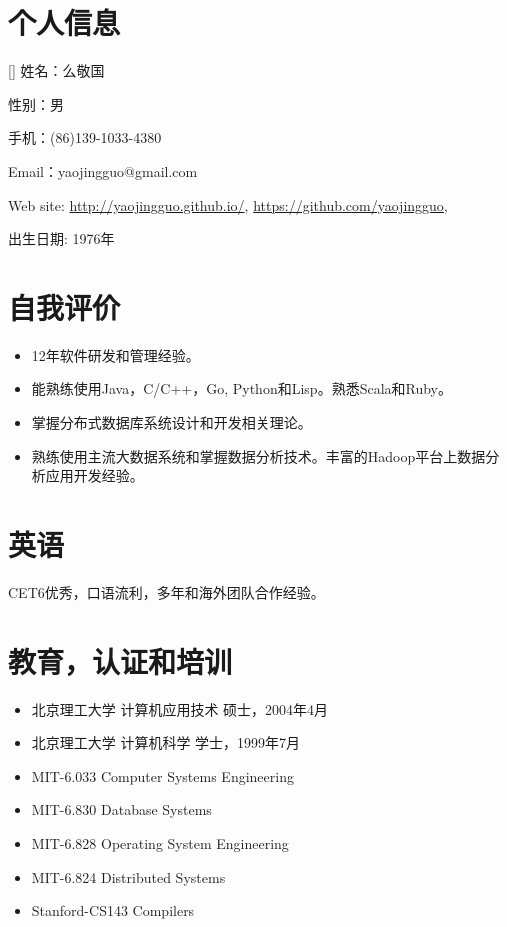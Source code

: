 \documentclass[a4paper]{article}
\newenvironment{DUlineblock}[1]{%
    \list{}{\setlength{\partopsep}{\parskip}
            \addtolength{\partopsep}{\baselineskip}
            \setlength{\topsep}{0pt}
            \setlength{\itemsep}{0.15\baselineskip}
            \setlength{\parsep}{0pt}
            \setlength{\leftmargin}{#1}}
    \raggedright
  }
  {\endlist}
\begin{document}
\begin{CJK}{UTF8}{gkai}

\section*{个人信息}

\begin{DUlineblock}{0em}
\item[] 姓名：么敬国
\item[] 性别：男
\item[] 手机：(86)139-1033-4380
\item[] Email：yaojingguo@gmail.com
\item[] Web site: \url{http://yaojingguo.github.io/},
\url{https://github.com/yaojingguo},
\item[] 出生日期: 1976年
\end{DUlineblock}


\section*{自我评价}
\begin{itemize}
\item 12年软件研发和管理经验。
\item 能熟练使用Java，C/C++，Go, Python和Lisp。熟悉Scala和Ruby。
\item 掌握分布式数据库系统设计和开发相关理论。
\item 熟练使用主流大数据系统和掌握数据分析技术。丰富的Hadoop平台上数据分析应用开发经验。
\end{itemize}

\section*{英语}
CET6优秀，口语流利，多年和海外团队合作经验。

\section*{教育，认证和培训}
\begin{itemize}
\item 北京理工大学       计算机应用技术            硕士，2004年4月
\item 北京理工大学       计算机科学                学士，1999年7月
\item MIT-6.033 Computer Systems Engineering
\item MIT-6.830 Database Systems
\item MIT-6.828 Operating System Engineering
\item MIT-6.824 Distributed Systems
\item Stanford-CS143 Compilers
\end{itemize}


\end{CJK}
\end{document}
